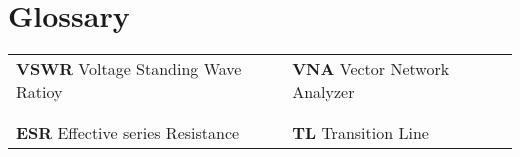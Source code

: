 \chapter*{Glossary}
\label{sec:glossary}
\begin{table*}[htb!]
    \addtocounter{table}{-1}
    \centering
    \begin{tabular}{ll}
         \normalsize{\textbf{VSWR}  Voltage Standing Wave Ratio}y&\normalsize{\textbf{VNA}  Vector Network Analyzer}\\
         &\\
         &\\
         \normalsize{\textbf{ESR}  Effective series Resistance}&\normalsize{\textbf{TL}  Transition Line}\\
        
    \end{tabular}
    \label{tab:my_label}
\end{table*}

